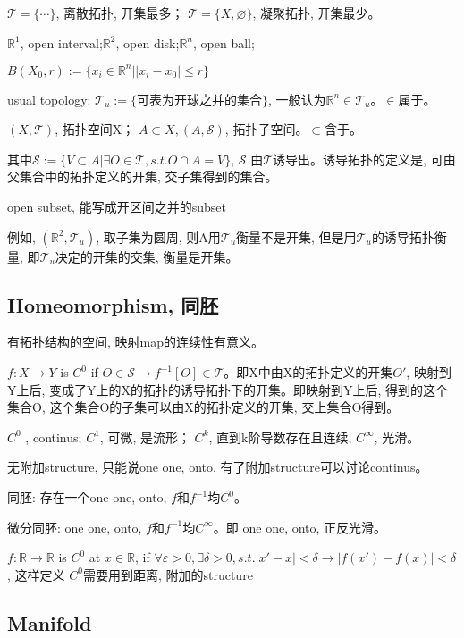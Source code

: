 \documentclass[UTF8]{../09-Mathematics}
\begin{document}
$\mathscr T = \{ \cdots \}$, 离散拓扑, 开集最多；
$\mathscr T = \{ X, \varnothing \}$, 凝聚拓扑, 开集最少。

$\mathbb{R}^1$, open interval;$\mathbb{R}^2$, open disk;$\mathbb{R}^n$, open ball;

$B(X_0, r) := \{ x_i \in \mathbb{R}^n |   |x_i - x_0| \leq r\}$

usual topology: $\mathscr T_u := \{ \mbox{可表为开球之并的集合}\}$, 一般认为$\mathbb{R}^n \in \mathscr T_u $。$\in$属于。

$(X, \mathscr T)$, 拓扑空间X；
$A \subset X,  (A, \mathscr S)$,  拓扑子空间。$ \subset $含于。

其中$\mathscr S := \{  V \subset A | \exists O \in \mathscr T, s.t. O \cap A = V\}$, $\mathscr S$ 由$\mathscr T$诱导出。诱导拓扑的定义是, 可由父集合中的拓扑定义的开集, 交子集得到的集合。

open subset, 能写成开区间之并的subset 

例如, $(\mathbb R^2, \mathscr T_u)$, 取子集为圆周, 则A用$\mathscr T_u$衡量不是开集, 但是用$\mathscr T_u$的诱导拓扑衡量, 即$\mathscr T_u$决定的开集的交集, 衡量是开集。


\subsection{Homeomorphism, 同胚}

有拓扑结构的空间, 映射map的连续性有意义。

$f:X \to Y$ is $C^0$ if $ O \in \mathscr S \rightarrow f^{-1}[O] \in \mathscr T$。即X中由X的拓扑定义的开集$O'$, 映射到Y上后, 变成了Y上的X的拓扑的诱导拓扑下的开集。即映射到Y上后, 得到的这个集合O, 这个集合O的子集可以由X的拓扑定义的开集, 交上集合O得到。

$C^0$ ,  continus; $C^1$, 可微, 是流形； $C^k$, 直到k阶导数存在且连续,  $C^\infty$, 光滑。


无附加structure, 只能说one one, onto,  有了附加structure可以讨论continus。

同胚: 存在一个one one, onto,  $f$和$f^{-1}$均$C^0$。

微分同胚: one one, onto,  $f$和$f^{-1}$均$C^\infty$。即 one one, onto,  正反光滑。

$f: \mathbb{R} \to \mathbb{R} $ is $C^0$ at $x\in  \mathbb{R}$, if $\forall \varepsilon >0, \exists \delta >0, s.t. |x' - x| < \delta \rightarrow |f(x') - f(x)| <   \delta$, 这样定义 $C^0$需要用到距离, 附加的structure


\subsection{Manifold}
\end{document}

